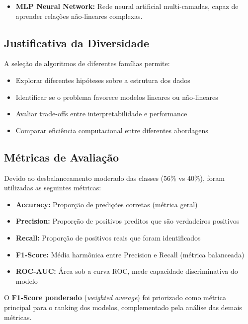 \documentclass[12pt,a4paper]{article}
\begin{document}
\begin{itemize}
    \item \textbf{MLP Neural Network:} Rede neural artificial multi-camadas, capaz de aprender relações não-lineares complexas.
\end{itemize}

\subsection{Justificativa da Diversidade}

A seleção de algoritmos de diferentes famílias permite:

\begin{itemize}
    \item Explorar diferentes hipóteses sobre a estrutura dos dados
    \item Identificar se o problema favorece modelos lineares ou não-lineares
    \item Avaliar trade-offs entre interpretabilidade e performance
    \item Comparar eficiência computacional entre diferentes abordagens
\end{itemize}

\subsection{Métricas de Avaliação}

Devido ao desbalanceamento moderado das classes (56\% vs 40\%), foram utilizadas as seguintes métricas:

\begin{itemize}
    \item \textbf{Accuracy:} Proporção de predições corretas (métrica geral)
    \item \textbf{Precision:} Proporção de positivos preditos que são verdadeiros positivos
    \item \textbf{Recall:} Proporção de positivos reais que foram identificados
    \item \textbf{F1-Score:} Média harmônica entre Precision e Recall (métrica balanceada)
    \item \textbf{ROC-AUC:} Área sob a curva ROC, mede capacidade discriminativa do modelo
\end{itemize}

O \textbf{F1-Score ponderado} (\textit{weighted average}) foi priorizado como métrica principal para o ranking dos modelos, complementado pela análise das demais métricas.
\end{document}
